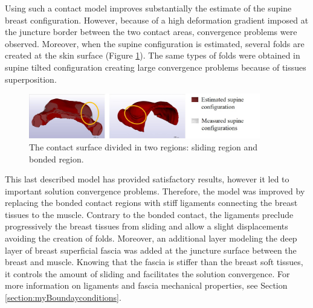 Using such a contact model improves substantially the estimate of the supine breast configuration. However, because of a high deformation gradient imposed at the juncture border between the two contact areas, convergence problems were observed. Moreover, when the supine configuration is estimated, several folds are created at the skin surface (Figure \ref{fig:mistcontactresults}). The same types of folds were obtained in supine tilted configuration creating large convergence problems because of tissues superposition.

\begin{figure}[!h]
\centering
\includegraphics[width=0.9\textwidth,keepaspectratio]{figures/mixt_contact_supine.jpg} 
\caption{The contact surface divided in two regions: sliding region and bonded region.}
\label{fig:mistcontactresults}
\end{figure}

This last described model has provided satisfactory results, however it led to important solution convergence problems. Therefore, the model was improved by replacing the bonded contact regions with stiff ligaments connecting the breast tissues to the muscle.  Contrary to the bonded contact, the ligaments preclude progressively the breast tissues from sliding and allow a slight displacements avoiding the creation of folds. Moreover, an additional layer modeling the deep layer of breast superficial fascia was added at the juncture surface between the breast and muscle. Knowing that the fascia is stiffer than the breast soft tissues, it controls the amount of sliding and facilitates the solution convergence. For more information on ligaments and fascia mechanical properties, see Section \ref{section:myBoundayconditions}.